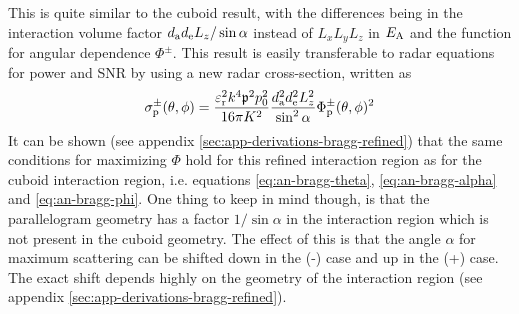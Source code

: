 \documentclass[11pt,twoside]{eitExjobb}
\begin{document}
	This is quite similar to the cuboid result, with the differences being in the interaction volume factor $d_{\mathrm{a}} d_{\mathrm{e}} L_{z}/\sin{\alpha}$ instead of $L_x L_y L_z$ in $E_{\mathrm{A}}$ and the function for angular dependence $\Phi^\pm$. This result is easily transferable to radar equations for power and SNR by using a new radar cross-section, written as
	\begin{equation*}
	\sigma_{\mathrm{p}}^\pm (\theta, \phi) = \frac{\varepsilon_{\mathrm{r}}^2 k^4 \mathfrak{p}^2 p_0^2}{16\pi K^2} \frac{d_{\mathrm{a}}^2 d_{\mathrm{e}}^2 L_{z}^2}{\sin^2{\alpha}} \Phi_{\mathrm{p}}^\pm (\theta,\phi)^2
	\end{equation*}
	It can be shown (see appendix \ref{sec:app-derivations-bragg-refined}) that the same conditions for maximizing $\Phi$ hold for this refined interaction region as for the cuboid interaction region, i.e. equations \eqref{eq:an-bragg-theta}, \eqref{eq:an-bragg-alpha} and \eqref{eq:an-bragg-phi}. One thing to keep in mind though, is that the parallelogram geometry has a factor $1/\sin{\alpha}$ in the interaction region which is not present in the cuboid geometry. The effect of this is that the angle $\alpha$ for maximum scattering can be shifted down in the (-) case and up in the (+) case. The exact shift depends highly on the geometry of the interaction region (see appendix \ref{sec:app-derivations-bragg-refined}).
	
\end{document}
